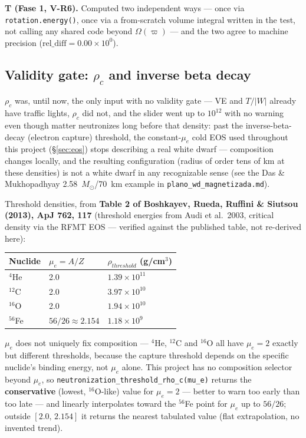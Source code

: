 \documentclass[11pt,a4paper]{scrartcl}
\newcommand{\code}[1]{\texttt{\small #1}}
\begin{document}
\textbf{T (Fase 1, V-R6).} Computed two independent ways --- once via
\code{rotation.energy()}, once via a from-scratch volume integral
written in the test, not calling any shared code beyond $\Omega(\varpi)$
--- and the two agree to machine precision ($\mathrm{rel\_diff}=0.00\times10^{0}$).

\subsection{\texorpdfstring{Validity gate: $\rho_c$ and inverse beta decay}{Validity gate: rho_c and inverse beta decay}}
\label{sec:rho-c-gate}

$\rho_c$ was, until now, the only input with no validity gate --- VE and
$T/|W|$ already have traffic lights, $\rho_c$ did not, and the slider
went up to $10^{12}$ with no warning even though matter neutronizes long
before that density: past the inverse-beta-decay (electron capture)
threshold, the constant-$\mu_e$ cold EOS used throughout this project
(\S\ref{sec:eos}) stops describing a real white dwarf --- composition
changes locally, and the resulting configuration (radius of order tens
of km at these densities) is not a white dwarf in any recognizable sense
(see the Das \& Mukhopadhyay 2.58~$M_\odot$/70~km example in
\code{plano\_wd\_magnetizada.md}).

Threshold densities, from \textbf{Table 2 of Boshkayev, Rueda, Ruffini \&
Siutsou (2013), ApJ 762, 117} (threshold energies from Audi et al.\ 2003,
critical density via the RFMT EOS --- verified against the published
table, not re-derived here):

\begin{center}
\begin{tabular}{@{}lll@{}}
\toprule
Nuclide & $\mu_e = A/Z$ & $\rho_{threshold}$ (g/cm$^3$)\\
\midrule
$^4$He & 2.0 & $1.39\times10^{11}$\\
$^{12}$C & 2.0 & $3.97\times10^{10}$\\
$^{16}$O & 2.0 & $1.94\times10^{10}$\\
$^{56}$Fe & $56/26\approx2.154$ & $1.18\times10^{9}$\\
\bottomrule
\end{tabular}
\end{center}

$\mu_e$ does not uniquely fix composition --- $^4$He, $^{12}$C and
$^{16}$O all have $\mu_e=2$ exactly but different thresholds, because the
capture threshold depends on the specific nuclide's binding energy, not
$\mu_e$ alone. This project has no composition selector beyond $\mu_e$,
so \code{neutronization\_threshold\_rho\_c(mu\_e)} returns the
\textbf{conservative} (lowest, $^{16}$O-like) value for $\mu_e=2$ ---
better to warn too early than too late --- and linearly interpolates
toward the $^{56}$Fe point for $\mu_e$ up to $56/26$; outside
$[2.0,\,2.154]$ it returns the nearest tabulated value (flat
extrapolation, no invented trend).
\end{document}
